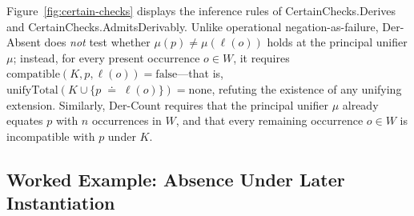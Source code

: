 \documentclass[11pt,a4paper]{article}
\theoremstyle{definition}
\DeclareRobustCommand{\lean}[1]{%
  \ifmmode\text{\normalfont\ttfamily\footnotesize\detokenize{#1}}%
  \else{\normalfont\footnotesize\leanurl{#1}}\fi}
\DeclareRobustCommand{\RuleName}[1]{\text{\normalfont\scshape\small #1}}
\def\lean#1{#1}%
\def\RuleName#1{#1}%
\newcommand{\doteqStore}{\;\doteq\;}
\begin{document}
Figure~\ref{fig:certain-checks} displays the inference rules of \lean{CertainChecks.Derives} and \lean{CertainChecks.AdmitsDerivably}. Unlike operational negation-as-failure, \RuleName{Der-Absent} does \emph{not} test whether $\mu(p) \neq \mu(\ell(o))$ holds at the principal unifier $\mu$; instead, for every present occurrence $o \in W$, it requires $\mathrm{compatible}(K, p, \ell(o)) = \mathrm{false}$---that is, $\mathrm{unifyTotal}(K \cup \{p \doteqStore \ell(o)\}) = \mathrm{none}$, refuting the existence of any unifying extension. Similarly, \RuleName{Der-Count} requires that the principal unifier $\mu$ already equates $p$ with $n$ occurrences in $W$, and that every remaining occurrence $o \in W$ is incompatible with $p$ under $K$.

\subsection{Worked Example: Absence Under Later Instantiation}
\end{document}
